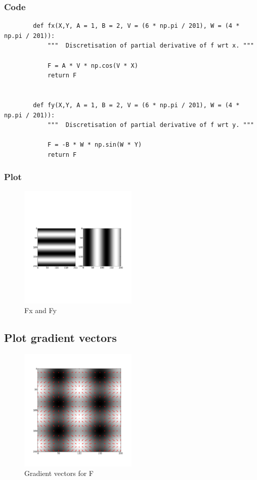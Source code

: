 \documentclass[abstract=true]{scrartcl}
\begin{document}
        \subsubsection{Code}
        \begin{verbatim}
        def fx(X,Y, A = 1, B = 2, V = (6 * np.pi / 201), W = (4 * np.pi / 201)):
            """  Discretisation of partial derivative of f wrt x. """
            
            F = A * V * np.cos(V * X)
            return F


        def fy(X,Y, A = 1, B = 2, V = (6 * np.pi / 201), W = (4 * np.pi / 201)):
            """  Discretisation of partial derivative of f wrt y. """

            F = -B * W * np.sin(W * Y)
            return F
        \end{verbatim}

        \subsubsection{Plot}
        \begin{figure}
          \centering
          \includegraphics[width=0.5\textwidth]{../images/0_fx_and_fy}
          \caption{Fx and Fy}
        \end{figure}

    \subsection{Plot gradient vectors}

        \begin{figure}
          \centering
          \includegraphics[width=0.5\textwidth]{../images/1_quiver}
          \caption{Gradient vectors for F}
        \end{figure}
\end{document}
